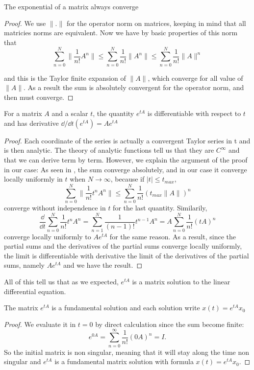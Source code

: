 \begin{lemme} \label{lem:exp}
The exponential of a matrix always converge
\end{lemme}
\begin{proof}
We use $\|.\|$ for the operator norm on matrices, keeping in mind that all matricies norms are equivalent. Now we have by basic properties of this norm that 
\[ \sum_{n=0}^N \|\frac{1}{n!}A^n\| 
\leq \sum_{n=0}^N \frac{1}{n!}\|A^n\| 
\leq \sum_{n=0}^N \frac{1}{n!}\|A\|^n \]

and this is the Taylor finite expansion of $\|A\|$, which converge for all value of $\|A\|$. As a result the sum is absolutely convergent for the operator norm, and then must converge.
\end{proof}
\begin{theoreme}
For a matrix $A$ and a scalar $t$, the quantity $e^{tA}$ is differentiable with respect to $t$ and has derivative $\dd/{\dd t} (e^{tA}) = Ae^{tA}$
\end{theoreme}
\begin{proof}
Each coordinate of the series is actually a convergent Taylor series in t and is then analytic. The theory of analytic functions tell us that they are $C^\infty$ and that we can derive term by term. However, we explain the argument of the proof in our case: As seen in , the sum converge absolutely, and in our case it converge locally uniformly in $t$ when $N\to\infty$, because if $|t|\leq t_{max}$, 
\[ \sum_{n=0}^N \|\frac{1}{n!}t^nA^n\|
\leq \sum_{n=0}^N \frac{1}{n!}(t_{max}\|A\|)^n\] converge without independence in $t$ for the last quantity. Similarily, \[ \frac{\dd}{\dd t}\sum_{n=0}^N\frac{1}{n!}t^nA^n
= \sum_{n=1}^N \frac{1}{(n-1)!}t^{n-1}A^n
= A\sum_{n=0}^N \frac{1}{n!}(tA)^n\]
converge locally uniformly to $Ae^{tA}$ for the same reason. As a result, since the partial sums and the derivatives of the partial sums converge locally uniformly, the limit is differentiable with derivative the limit of the derivatives of the partial sums, namely $Ae^{tA}$ and we have the result.
\end{proof}
All of this tell us that as we expected, $e^{tA}$ is a matrix solution to the linear differential equation.
\begin{corollaire}
The matrix $e^{tA}$ is a fundamental solution and each solution write $x(t)=e^{tA}x_0$
\end{corollaire}
\begin{proof}
We evaluate it in $t=0$ by direct calculation since the sum become finite: 
\[e^{0A}=\sum_{n=0}^\infty \frac{1}{n!}(0A)^n = I.\]
So the initial matrix is non singular, meaning that it will stay along the time non singular and $e^{tA}$ is a fundamental matrix solution with formula $x(t)=e^{tA}x_0$.
\end{proof}

